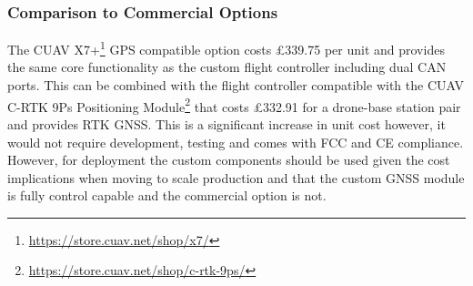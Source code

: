 \subsubsection{Comparison to Commercial Options}\label{sub_sub_section:tgt_commercial_options}

The CUAV X7+\footnote{\url{https://store.cuav.net/shop/x7/}} GPS compatible option costs £339.75 per unit and provides the same core functionality as the custom flight controller including dual \gls{CAN} ports. This can be combined with the flight controller compatible with the CUAV C-RTK 9Ps Positioning Module\footnote{\url{https://store.cuav.net/shop/c-rtk-9ps/}} that costs £332.91 for a drone-base station pair and provides \gls{RTK} \gls{GNSS}. This is a significant increase in unit cost however, it would not require development, testing and comes with FCC and CE compliance. However, for deployment the custom components should be used given the cost implications when moving to scale production and that the custom \gls{GNSS} module is fully control capable and the commercial option is not. 

